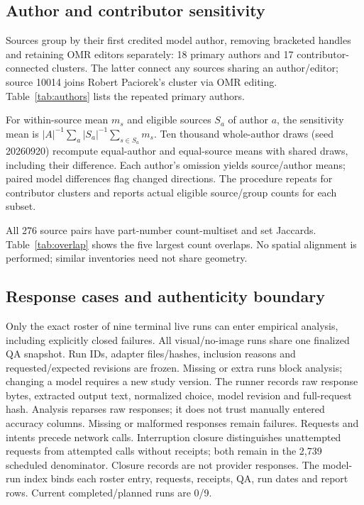 \documentclass[10pt,twocolumn,letterpaper]{article}
\begin{document}
\subsection{Author and contributor sensitivity}
Sources group by their first credited model author, removing bracketed
handles and retaining OMR editors separately: 18 primary authors and
17 contributor-connected clusters. The latter connect any sources sharing
an author/editor; source 10014 joins Robert Paciorek's cluster via OMR
editing. Table~\ref{tab:authors} lists the repeated primary authors.

\begin{table}[H]
\centering\small
\caption{Repeated primary authors: 10/24 sources in four groups.
Other primary-author groups each contain one source.}
\label{tab:authors}

\end{table}

For within-source mean $m_s$ and eligible sources $S_a$ of author $a$,
the sensitivity mean is
$|A|^{-1}\sum_a |S_a|^{-1}\sum_{s\in S_a}m_s$.
Ten thousand whole-author draws (seed 20260920) recompute equal-author
and equal-source means with shared draws, including their difference.
Each author's omission yields source/author means; paired model
differences flag changed directions. The procedure repeats for contributor
clusters and reports actual eligible source/group counts for each subset.

All 276 source pairs have part-number count-multiset and set Jaccards.
Table~\ref{tab:overlap} shows the five largest count overlaps. No spatial
alignment is performed; similar inventories need not share geometry.

\begin{table}[H]
\centering\small
\caption{Largest inventory overlaps. Count J. is
$\sum_t\min(n_{at},n_{bt})/\sum_t\max(n_{at},n_{bt})$;
Set J. is intersection/union of distinct part types.}
\label{tab:overlap}

\end{table}

\subsection{Response cases and authenticity boundary}
Only the exact roster of nine terminal live runs can enter empirical
analysis, including explicitly closed failures. All visual/no-image runs
share one finalized QA snapshot. Run IDs, adapter files/hashes, inclusion
reasons and requested/expected revisions are frozen. Missing or extra
runs block analysis; changing a model requires a new study version.
The runner records raw response bytes, extracted output
text, normalized choice, model revision and full-request hash. Analysis
reparses raw responses; it does not trust manually entered accuracy
columns. Missing or malformed responses remain failures. Requests and
intents precede network calls. Interruption closure distinguishes unattempted
requests from attempted calls without receipts; both remain in the 2,739
scheduled denominator. Closure records are not provider responses.
The model-run index binds each roster entry, requests, receipts, QA,
run dates and report rows. Current completed/planned runs are 0/9.
\end{document}
